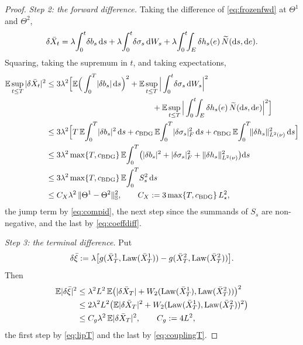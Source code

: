 \begin{proof}
\emph{Step 2: the forward difference.} Taking the difference of \eqref{eq:frozenfwd} at
$\Theta^1$ and $\Theta^2$,
\[
\delta\bar X_t=\lambda\!\int_0^t\!\delta b_s\,\mathrm{d} s+\lambda\!\int_0^t\!\delta\sigma_s\,\mathrm{d} W_s
+\lambda\!\int_0^t\!\!\int_E\delta h_s(e)\,\widetilde{N}(\mathrm{d} s,\mathrm{d} e) .
\]
Squaring, taking the supremum in $t$, and taking expectations,
\begin{equation}\label{eq:fwddiff}
\begin{aligned}
\E\sup_{t\le T}|\delta\bar X_t|^2
&\le 3\lambda^2\Big[\E\Big(\int_0^T\!|\delta b_s|\,\diff s\Big)^{2}
+\E\sup_{t\le T}\Big|\int_0^t\!\delta\sigma_s\,\diff W_s\Big|^{2}\\
&\hspace{13.4em}+\E\sup_{t\le T}\Big|\int_0^t\!\!\int_E\delta h_s(e)\,\Nt(\diff s,\diff e)\Big|^{2}\Big]\\
&\le 3\lambda^2\Big[T\,\E\!\int_0^T\!|\delta b_s|^2\,\diff s
+c_{\mathrm{BDG}}\,\E\!\int_0^T\!|\delta\sigma_s|_F^2\,\diff s
+c_{\mathrm{BDG}}\,\E\!\int_0^T\!\Lnorm{\delta h_s}^2\,\diff s\Big]\\
&\le 3\lambda^2\max\{T,c_{\mathrm{BDG}}\}\,
\E\!\int_0^T\!\big(|\delta b_s|^2+|\delta\sigma_s|_F^2+\Lnorm{\delta h_s}^2\big)\diff s\\
&\le 3\lambda^2\max\{T,c_{\mathrm{BDG}}\}\,\E\!\int_0^T\! S_s^2\,\diff s\\
&\le C_X\lambda^2\,\|\Theta^1-\Theta^2\|_{\HH}^2 ,
\qquad C_X:=3\max\{T,c_{\mathrm{BDG}}\}\,L_\star^2 ,
\end{aligned}
\end{equation}
the jump term by \eqref{eq:compid}, the next step since the summands of $S_s$ are
non-negative, and the last by \eqref{eq:coeffdiff}.

\emph{Step 3: the terminal difference.} Put
\[
\delta\bar\xi:=\lambda\big[g(\bar X^1_T,\mathrm{Law}(\bar X^1_T))-g(\bar X^2_T,\mathrm{Law}(\bar X^2_T))\big].
\]
Then
\begin{equation}\label{eq:terdiff}
\begin{aligned}
\mathbb{E}|\delta\bar\xi|^2
&\le\lambda^2L^2\,\mathbb{E}\big(|\delta\bar X_T|+W_2(\mathrm{Law}(\bar X^1_T),\mathrm{Law}(\bar X^2_T))\big)^2\\
&\le2\lambda^2L^2\big(\mathbb{E}|\delta\bar X_T|^2+W_2(\mathrm{Law}(\bar X^1_T),\mathrm{Law}(\bar X^2_T))^2\big)\\
&\le C_g\lambda^2\,\mathbb{E}|\delta\bar X_T|^2 ,\qquad C_g:=4L^2 ,
\end{aligned}
\end{equation}
the first step by \eqref{eq:lipT} and the last by \eqref{eq:couplingT}.


\end{proof}
